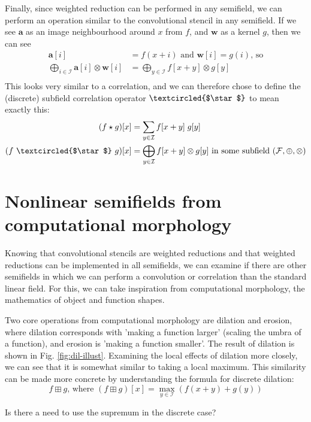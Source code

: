 \documentclass[a4paper, 12pt]{report}
\def\comment#1{\color{red}#1\color{black}}
\begin{document}
Finally, since weighted reduction can be performed in any semifield, we can perform an operation similar to the convolutional stencil in any semifield. If we see $\mathbf{a}$ as an image neighbourhood around $x$ from $f$, and $\mathbf{w}$ as a kernel $g$, then we can see
\begin{align*}
\mathbf{a}[i] &= f(x + i) \textrm{ and } \mathbf{w}[i] = g(i) \textrm{, so} \\
\bigoplus_{i\in \mathcal{I}}\mathbf{a}[i] \otimes \mathbf{w}[i]
&= \bigoplus_{y\in \mathcal{I}}f[x+y] \otimes g[y] \\
\end{align*}
This looks very similar to a correlation, and we can therefore chose to define the (discrete) subfield correlation operator $\textcircled{$\star$}$ to mean exactly this:
\begin{align*}
	(f \star g)[x] &= \sum_{y\in\mathcal{I}}f[x+y]\; g[y]\\
	(f ~\textcircled{$\star$}~ g)[x] &=\bigoplus_{y\in \mathcal{I}}f[x+y] \otimes g[y] \textrm{ in some subfield $(\mathcal{F}, \oplus, \otimes)$}
\end{align*}
\section{Nonlinear semifields from computational morphology}
Knowing that convolutional stencils are weighted reductions and that weighted reductions can be implemented in all semifields, we can examine if there are other semifields in which we can perform a convolution or correlation than the standard linear field. For this, we can take inspiration from computational morphology, the mathematics of object and function shapes.

Two core operations from computational morphology are dilation and erosion, where dilation corresponds with 'making a function larger' (scaling the umbra of a function), and erosion is 'making a function smaller'. The result of dilation is shown in Fig. \ref{fig:dil-illust}. Examining the local effects of dilation more closely, we can see that it is somewhat similar to taking a local maximum. This similarity can be made more concrete by understanding the formula for discrete dilation: 
$$f \boxplus g \textrm{, where }(f \boxplus g)[x] = \max_{y\in\mathcal{I}} \left(f(x+y) + g(y)\right)$$

\comment{Is there a need to use the supremum in the discrete case?}
\end{document}
